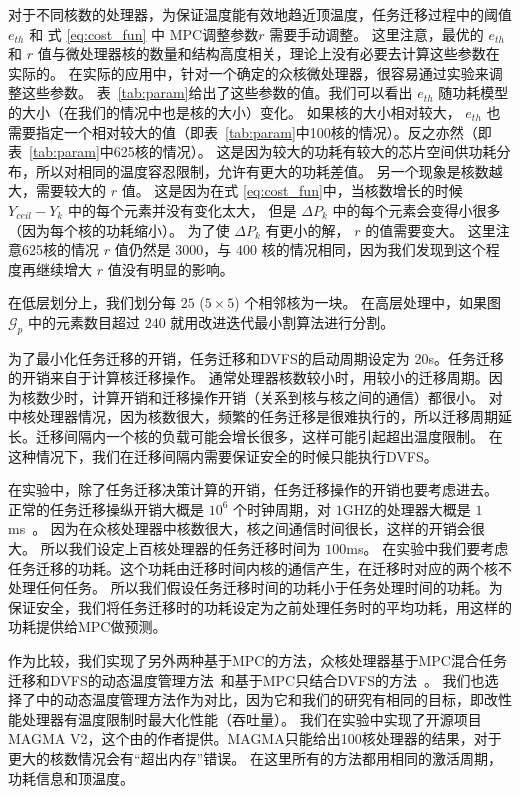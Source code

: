对于不同核数的处理器，为保证温度能有效地趋近顶温度，任务迁移过程中的阈值 $e_{th}$ 和 式 \eqref{eq:cost_fun} 中 MPC调整参数$r$ 需要手动调整。
这里注意，最优的 $e_{th}$ 和 $r$ 值与微处理器核的数量和结构高度相关，理论上没有必要去计算这些参数在实际的。
在实际的应用中，针对一个确定的众核微处理器，很容易通过实验来调整这些参数。
表~\ref{tab:param}给出了这些参数的值。我们可以看出 $e_{th}$ 随功耗模型的大小（在我们的情况中也是核的大小）变化。
如果核的大小相对较大， $e_{th}$ 也需要指定一个相对较大的值（即表~\ref{tab:param}中100核的情况）。反之亦然（即表~\ref{tab:param}中625核的情况）。
这是因为较大的功耗有较大的芯片空间供功耗分布，所以对相同的温度容忍限制，允许有更大的功耗差值。
另一个现象是核数越大，需要较大的 $r$ 值。
这是因为在式 \eqref{eq:cost_fun}中，当核数增长的时候$Y_{ceil}-Y_k$ 中的每个元素并没有变化太大，
但是 $\Delta P_k$ 中的每个元素会变得小很多（因为每个核的功耗缩小）。
为了使 $\Delta P_k$ 有更小的解， $r$ 的值需要变大。
这里注意625核的情况 $r$ 值仍然是 $3000$，与 $400$ 核的情况相同，因为我们发现到这个程度再继续增大 $r$ 值没有明显的影响。

在低层划分上，我们划分每 $25$ ($5 \times 5$) 个相邻核为一块。
在高层处理中，如果图 $\mathcal{G}_p$ 中的元素数目超过 $240$ 就用改进迭代最小割算法进行分割。

为了最小化任务迁移的开销，任务迁移和DVFS的启动周期设定为 $20$s。任务迁移的开销来自于计算核迁移操作。
通常处理器核数较小时，用较小的迁移周期。因为核数少时，计算开销和迁移操作开销（关系到核与核之间的通信）都很小。
对中核处理器情况，因为核数很大，频繁的任务迁移是很难执行的，所以迁移周期延长。迁移间隔内一个核的负载可能会增长很多，这样可能引起超出温度限制。
在这种情况下，我们在迁移间隔内需要保证安全的时候只能执行DVFS。

在实验中，除了任务迁移决策计算的开销，任务迁移操作的开销也要考虑进去。
正常的任务迁移操纵开销大概是 $10^6$ 个时钟周期，对 $1$GHZ的处理器大概是 $1$ms~\cite{Cuesta:ISVLSI'10}。
因为在众核处理器中核数很大，核之间通信时间很长，这样的开销会很大。
所以我们设定上百核处理器的任务迁移时间为 $100$ms。
在实验中我们要考虑任务迁移的功耗。这个功耗由迁移时间内核的通信产生，在迁移时对应的两个核不处理任何任务。
所以我们假设任务迁移时间的功耗小于任务处理时间的功耗。为保证安全，我们将任务迁移时的功耗设定为之前处理任务时的平均功耗，用这样的功耗提供给MPC做预测。

作为比较，我们实现了另外两种基于MPC的方法，众核处理器基于MPC混合任务迁移和DVFS的动态温度管理方法~\cite{MaWang:APCCAS'14}和基于MPC只结合DVFS的方法~\cite{Zanini:ECCTD'09}。
我们也选择了\cite{Hanumaiah:TCAD'11}中的动态温度管理方法作为对比，因为它和我们的研究有相同的目标，即改性能处理器有温度限制时最大化性能（吞吐量）。
我们在实验中实现了开源项目 MAGMA V2，这个由\cite{Hanumaiah:TCAD'11}的作者提供。MAGMA只能给出100核处理器的结果，对于更大的核数情况会有“超出内存”错误。
在这里所有的方法都用相同的激活周期，功耗信息和顶温度。

